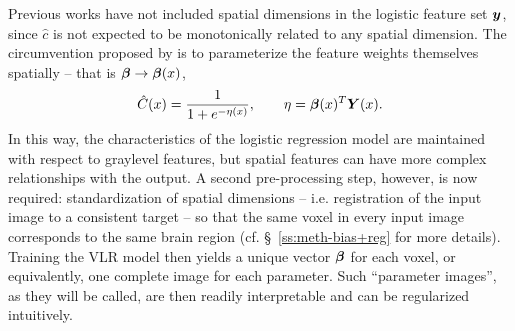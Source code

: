 \par
Previous works have not included spatial dimensions in the logistic feature set $\bm{y}$, since $\hat{c}$ is not expected to be monotonically related to any spatial dimension.
The circumvention proposed by \citeauthor{Schmidt2015} is to parameterize the feature weights themselves spatially -- that is $\bm{\beta}\rightarrow\bm{\beta}(x)$,
\begin{equation}
  \hat{C}(x) = \frac{1}{1+e^{-\eta(x)}},\qquad\eta = \bm{\beta}(x)^T\bm{Y}(x).
  \label{eq:eq:vlrmodel}
\end{equation}
In this way, the characteristics of the logistic regression model are maintained with respect to graylevel features, but spatial features can have more complex relationships with the output.
A second pre-processing step, however, is now required: standardization of spatial dimensions -- i.e. registration of the input image to a consistent target -- so that the same voxel in every input image corresponds to the same brain region (cf. \S\ \ref{ss:meth-bias+reg} for more details).
Training the VLR model then yields a unique vector $\bm{\beta}$ for each voxel, or equivalently, one complete image for each parameter.
Such ``parameter images'', as they will be called, are then readily interpretable and can be regularized intuitively.
